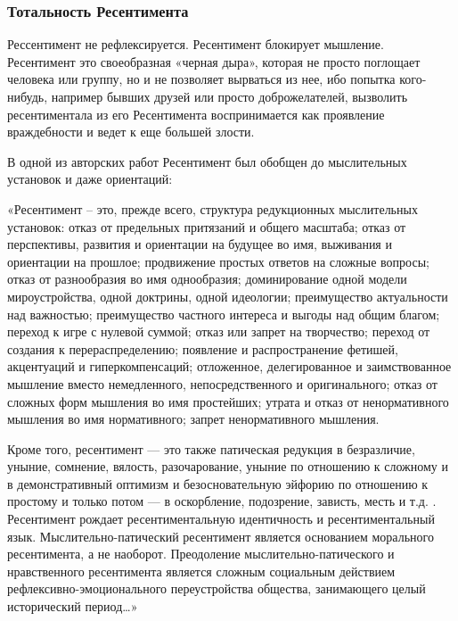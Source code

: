  
 
 
 
 

\subsubsection{Тотальность Ресентимента}
\label{sec:11_02_2022.stz.news.ua.hvylya.1.vse_zlo_ot_ressentimenta.3.totalnost}

Рессентимент не рефлексируется. Ресентимент блокирует мышление. Ресентимент это
своеобразная «черная дыра», которая не просто поглощает человека или группу, но
и не позволяет вырваться из нее, ибо попытка кого-нибудь, например бывших
друзей или просто доброжелателей, вызволить ресентиментала из его Ресентимента
воспринимается как проявление враждебности и ведет к еще большей злости.

В одной из авторских работ Ресентимент был обобщен до мыслительных установок и
даже ориентаций:

«Ресентимент – это, прежде всего, структура редукционных мыслительных
установок: отказ от предельных притязаний и общего масштаба; отказ от
перспективы, развития и ориентации на будущее во имя, выживания и ориентации на
прошлое; продвижение простых ответов на сложные вопросы; отказ от разнообразия
во имя однообразия; доминирование одной модели мироустройства, одной доктрины,
одной идеологии; преимущество актуальности над важностью; преимущество частного
интереса и выгоды над общим благом; переход к игре с нулевой суммой; отказ или
запрет на творчество; переход от создания к перераспределению; появление и
распространение фетишей, акцентуаций и гиперкомпенсаций; отложенное,
делегированное и заимствованное мышление вместо немедленного, непосредственного
и оригинального; отказ от сложных форм мышления во имя простейших; утрата и
отказ от ненормативного мышления во имя нормативного; запрет ненормативного
мышления.

Кроме того, ресентимент — это также патическая редукция в безразличие, уныние,
сомнение, вялость, разочарование, уныние по отношению к сложному и в
демонстративный оптимизм и безосновательную эйфорию по отношению к простому и
только потом — в оскорбление, подозрение, зависть, месть и т.д. . Ресентимент
рождает ресентиментальную идентичность и ресентиментальный язык.
Мыслительно-патический ресентимент является основанием морального ресентимента,
а не наоборот. Преодоление мыслительно-патического и нравственного ресентимента
является сложным социальным действием рефлексивно-эмоционального переустройства
общества, занимающего целый исторический период…»

